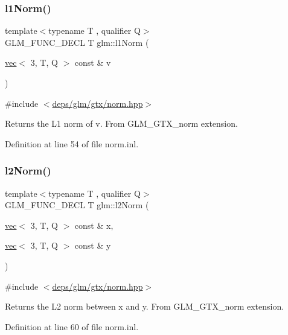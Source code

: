 \subsubsection{\texorpdfstring{l1\+Norm()}{l1Norm()}\hspace{0.1cm}{\footnotesize\ttfamily [2/2]}}
{\footnotesize\ttfamily template$<$typename T , qualifier Q$>$ \\
G\+L\+M\+\_\+\+F\+U\+N\+C\+\_\+\+D\+E\+CL T glm\+::l1\+Norm (\begin{DoxyParamCaption}\item[{\hyperlink{structglm_1_1vec}{vec}$<$ 3, T, Q $>$ const \&}]{v }\end{DoxyParamCaption})}



{\ttfamily \#include $<$\hyperlink{norm_8hpp}{deps/glm/gtx/norm.\+hpp}$>$}

Returns the L1 norm of v. From G\+L\+M\+\_\+\+G\+T\+X\+\_\+norm extension. 

Definition at line 54 of file norm.\+inl.

\mbox{\label{group__gtx__norm_ga41340b2ef40a9307ab0f137181565168}} 
\subsubsection{\texorpdfstring{l2\+Norm()}{l2Norm()}\hspace{0.1cm}{\footnotesize\ttfamily [1/2]}}
{\footnotesize\ttfamily template$<$typename T , qualifier Q$>$ \\
G\+L\+M\+\_\+\+F\+U\+N\+C\+\_\+\+D\+E\+CL T glm\+::l2\+Norm (\begin{DoxyParamCaption}\item[{\hyperlink{structglm_1_1vec}{vec}$<$ 3, T, Q $>$ const \&}]{x,  }\item[{\hyperlink{structglm_1_1vec}{vec}$<$ 3, T, Q $>$ const \&}]{y }\end{DoxyParamCaption})}



{\ttfamily \#include $<$\hyperlink{norm_8hpp}{deps/glm/gtx/norm.\+hpp}$>$}

Returns the L2 norm between x and y. From G\+L\+M\+\_\+\+G\+T\+X\+\_\+norm extension. 

Definition at line 60 of file norm.\+inl.


